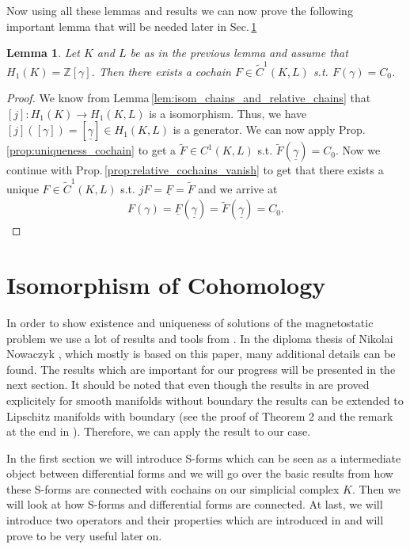 \documentclass[12pt,a4paper]{article}
\numberwithin{equation}{subsection}
\newtheorem{lemma}{Lemma}[section]
\numberwithin{lemma}{subsection}
\theoremstyle{definition}
\newcommand{\integers}{\mathbb{Z}}
\begin{document}
Now using all these lemmas and results we can now prove the following
important lemma that will be needed later in Sec.\,\ref{}

\begin{lemma}\label{lem:existence_vanishing_cochain}
    Let $K$ and $L$ be as in the previous lemma and assume that 
    $H_1(K) = \integers [\gamma]$. Then there exists a cochain 
    $F \in \tilde{C}^1(K,L)$ s.t. $F(\gamma) = C_0$.
\end{lemma}
\begin{proof}
    We know from Lemma\,\ref{lem:isom_chains_and_relative_chains}
    that $[j]:H_1(K) \rightarrow H_1(K,L)$ is a isomorphism. Thus, we have
    $[j]([\gamma]) = [\underline{\gamma}] \in H_1(K,L)$ is a generator. 
    We can now apply Prop.\,\ref{prop:uniqueness_cochain} to get a 
    $\tilde{F} \in C^1(K,L)$ s.t. $\tilde{F}(\underline{\gamma}) = C_0$.
    Now we continue with Prop.\,\ref{prop:relative_cochains_vanish} to 
    get that there exists a unique $F \in \tilde{C}^1(K,L)$ s.t. 
    $jF = \underline{F} = \tilde{F}$ and we arrive at 
    \begin{align*}
        F(\gamma) = \underline{F}(\underline{\gamma}) 
        = \tilde{F}(\underline{\gamma}) = C_0.
    \end{align*}
\end{proof}



\section{Isomorphism of Cohomology}

In order to show existence and uniqueness of solutions of the magnetostatic 
problem we use a lot of results and tools from \cite{goldshtein}. 
In the diploma thesis of Nikolai
Nowaczyk \cite{nowaczyk}, which mostly is based on this paper, 
many additional details can be found. The results which are important for 
our progress will be presented in the
next section. It should be noted that even though the results in 
\cite{goldshtein} are
proved explicitely for smooth manifolds without boundary the results can be 
extended to Lipschitz manifolds with boundary (see the proof of Theorem 2 and 
the remark at the end in \cite{goldshtein}). Therefore, we can apply the result
to our case.

In the first section we will introduce S-forms which can be seen as a
intermediate object between differential forms and we will go over the 
basic results from \cite{goldshtein} how these S-forms are connected with 
cochains on our simplicial complex $K$. Then we will look at how S-forms 
and differential forms are connected. At last, we will introduce two  
operators and their properties which are introduced in \cite{goldshtein}
and will prove to be very useful later on.
\end{document}
